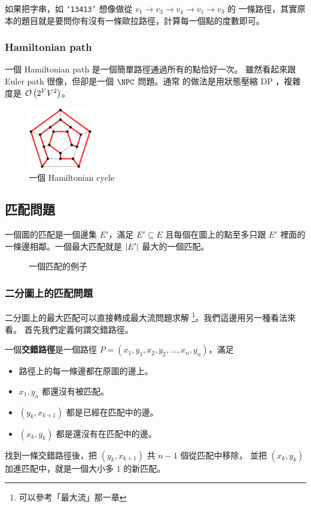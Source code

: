 \documentclass[a4paper,12pt]{book}
\begin{document}
如果把字串，如 \texttt{`13413'} 想像做從 $v_1 \to v_3 \to v_4 \to v_1 \to v_3$ 的
一條路徑，其實原本的題目就是要問你有沒有一條歐拉路徑，計算每一個點的度數即可。

\subsubsection{Hamiltonian path}
一個 Hamiltonian path 是一個簡單路徑通過所有的點恰好一次。
雖然看起來跟 Euler path 很像，但卻是一個 $\NPC$ 問題。通常
的做法是用狀態壓縮 DP ，複雜度是 $\operatorname{\mathcal{O}}\left(2^V V^2\right)$。

\begin{figure}[H]
  \centering
  \includegraphics[width=0.25\textwidth]{tikz/hamilt.png}
  \caption{一個 Hamiltonian cycle}
\end{figure}


\subsection{匹配問題}
一個圖的匹配是一個邊集 $E'$，滿足 $E' \subseteq E$ 且每個在圖上的點至多只跟
$E'$ 裡面的一條邊相鄰。一個最大匹配就是 $\lvert E' \rvert$ 最大的一個匹配。

\begin{figure}[H]
  \centering
  
  \caption{一個匹配的例子}
\end{figure}

\subsubsection{二分圖上的匹配問題}
二分圖上的最大匹配可以直接轉成最大流問題求解
\footnote{可以參考「最大流」那一章}。我們這邊用另一種看法來看。
首先我們定義何謂交錯路徑。
\begin{theorem}[定義]
  一個{\bf 交錯路徑}是一個路徑 $P = (x_1, y_1, x_2, y_2, \dots, x_n, y_n)$，滿足
  \begin{itemize}
    \item 路徑上的每一條邊都在原圖的邊上。
    \item $x_1, y_n$ 都還沒有被匹配。
    \item $(y_k, x_{k+1})$ 都是已經在匹配中的邊。
    \item $(x_k, y_{k})$ 都是還沒有在匹配中的邊。
  \end{itemize}
  找到一條交錯路徑後，把 $(y_k, x_{k+1})$ 共 $n-1$ 個從匹配中移除，
  並把 $(x_k, y_k)$ 加進匹配中，就是一個大小多 $1$ 的新匹配。
\end{theorem}
\end{document}
